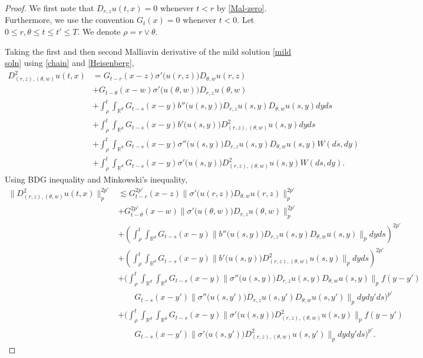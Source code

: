 \documentclass[12pt]{article}
\def\bR{\mathbb{R}}
\def\s{\sigma}
\newcommand{\les}{\lesssim}
\begin{document}
\begin{proof}
We first note that $D_{r,z}u(t,x) = 0$ whenever $t < r$ by \eqref{Mal-zero}. Furthermore, we use the convention $G_t(x) = 0$ whenever $t < 0$. Let $0\leq r,\theta \leq t \leq t' \leq T$. We denote $\rho = r \vee \theta$.

Taking the first and then second Malliavin derivative of the mild solution \eqref{mild soln} using \eqref{chain} and \eqref{Heisenberg}, 
\begin{align*}
D^2_{(r,z),(\theta,w)}u(t,x) & =  G_{t-r}(x-z) \s'\big(u(r,z)\big) D_{\theta,w} u(r,z) \\
& + G_{t-\theta}(x-w) \s'\big(u(\theta,w)\big) D_{r,z} u(\theta,w) \\
& + \int_\rho^t \int_{\bR^d} G_{t-s}(x-y) b''\big(u(s,y)\big) D_{r,z}u(s,y) D_{\theta,w}u(s,y)  dyds \\
& + \int_\rho^t \int_{\bR^d} G_{t-s}(x-y) b'\big(u(s,y)\big) D_{(r,z),(\theta,w)}^2 u(s,y) dyds \\
& + \int_\rho^t \int_{\bR^d} G_{t-s}(x-y) \s''\big(u(s,y)\big) D_{r,z}u(s,y) D_{\theta,w}u(s,y)  W(ds,dy)\\
& + \int_\rho^t \int_{\bR^d} G_{t-s}(x-y) \s'\big(u(s,y)\big) D_{(r,z),(\theta,w)}^2 u(s,y) W(ds,dy).
\end{align*}
Using BDG inequality and Minkowski's inequality,
\begin{align*}
\|D^2_{(r,z),(\theta,w)}u(t,x)\|_p^{2p'} & \les  G^{2p'}_{t-r}(x-z) \|\s'\big(u(r,z)\big) D_{\theta,w} u(r,z)\|_p^{2p'} \\
& + G^{2p'}_{t-\theta}(x-w) \|\s'\big(u(\theta,w)\big) D_{r,z} u(\theta,w)\|_p^{2p'} \\
& + \left(\int_\rho^t \int_{\bR^d} G_{t-s}(x-y) \|b''\big(u(s,y)\big) D_{r,z}u(s,y) D_{\theta,w}u(s,y)\|_p  dyds\right)^{2p'} \\
& + \left(\int_\rho^t \int_{\bR^d} G_{t-s}(x-y) \|b'\big(u(s,y)\big) D_{(r,z),(\theta,w)}^2 u(s,y)\|_p dyds\right)^{2p'} \\
& + \bigg(\int_\rho^t \int_{\bR^d} \int_{\bR^d} G_{t-s}(x-y) \|\s''\big(u(s,y)\big) D_{r,z}u(s,y) D_{\theta,w}u(s,y)\|_p f(y-y')  \\
& \qquad G_{t-s}(x-y') \|\s''\big(u(s,y')\big) D_{r,z}u(s,y') D_{\theta,w}u(s,y')\|_p dy dy' ds \bigg)^{p'}\\
& + \bigg( \int_\rho^t \int_{\bR^d} \int_{\bR^d} G_{t-s}(x-y) \|\s'\big(u(s,y)\big) D_{(r,z),(\theta,w)}^2 u(s,y)\|_pf(y-y')  \\
& \qquad G_{t-s}(x-y') \|\s'\big(u(s,y')\big) D_{(r,z),(\theta,w)}^2 u(s,y')\|_p dy dy' ds \bigg)^{p'}.

\end{align*}
\end{proof}
\end{document}
